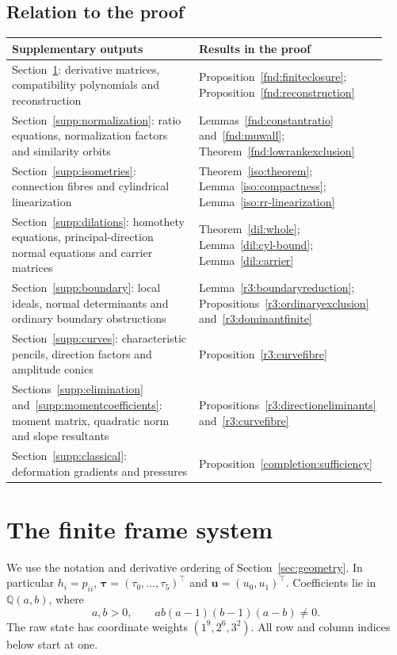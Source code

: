 \subsection*{Relation to the proof}
\noindent\begin{tabular}{@{}>{\raggedright\arraybackslash}p{0.51\linewidth}
                       >{\raggedright\arraybackslash}p{0.43\linewidth}@{}}
\toprule Supplementary outputs & Results in the proof\\\midrule
Section~\ref{supp:frame}: derivative matrices, compatibility polynomials
and reconstruction & Proposition~\ref{fnd:finiteclosure};
Proposition~\ref{fnd:reconstruction}\\[7pt]
Section~\ref{supp:normalization}: ratio equations, normalization factors
and similarity orbits & Lemmas~\ref{fnd:constantratio}
and~\ref{fnd:muwall}; Theorem~\ref{fnd:lowrankexclusion}\\[7pt]
Section~\ref{supp:isometries}: connection fibres and cylindrical
linearization & Theorem~\ref{iso:theorem};
Lemma~\ref{iso:compactness}; Lemma~\ref{iso:rr-linearization}\\[7pt]
Section~\ref{supp:dilations}: homothety equations, principal-direction
normal equations and carrier matrices & Theorem~\ref{dil:whole};
Lemma~\ref{dil:cyl-bound}; Lemma~\ref{dil:carrier}\\[7pt]
Section~\ref{supp:boundary}: local ideals, normal determinants
and ordinary boundary obstructions & Lemma~\ref{r3:boundaryreduction};
Propositions~\ref{r3:ordinaryexclusion}
and~\ref{r3:dominantfinite}\\[7pt]
Section~\ref{supp:curves}: characteristic pencils, direction factors
and amplitude conics & Proposition~\ref{r3:curvefibre}\\[7pt]
Sections~\ref{supp:elimination} and~\ref{supp:momentcoefficients}:
moment matrix, quadratic norm and slope resultants &
Propositions~\ref{r3:directioneliminants}
and~\ref{r3:curvefibre}\\[7pt]
Section~\ref{supp:classical}: deformation gradients and pressures &
Proposition~\ref{completion:sufficiency}\\
\bottomrule
\end{tabular}

\section{The finite frame system}\label{supp:frame}

We use the notation and derivative ordering of
Section~\ref{sec:geometry}. In particular $h_i=p_{ii}$,
$\boldsymbol\tau=(\tau_0,\ldots,\tau_5)^{\top}$ and
$\boldsymbol u=(u_0,u_1)^{\top}$. Coefficients lie in
$\mathbb Q(a,b)$, where
\[
 a,b>0,\qquad ab(a-1)(b-1)(a-b)\ne0.
\]
The raw state has coordinate weights $(1^9,2^6,3^2)$.
All row and column indices below start at one.

